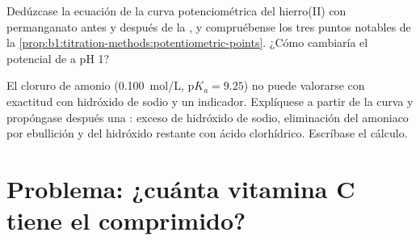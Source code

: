 \begin{exercise}[$\star\star\star$]\label{exo:b1:titration-methods:11}
Dedúzcase la ecuación de la curva potenciométrica del hierro(II) con
permanganato antes y después de la , y compruébense los tres
puntos notables de la
\cref{prop:b1:titration-methods:potentiometric-points}. ¿Cómo cambiaría
el potencial de  a pH 1?
\end{exercise}

\begin{exercise}[$\star\star\star$]\label{exo:b1:titration-methods:12}
El cloruro de amonio (\qty{0.100}{mol/L}, $\mathrm{p}K_a = 9.25$) no
puede valorarse con exactitud con hidróxido de sodio y un indicador.
Explíquese a partir de la curva y propóngase después una : exceso de hidróxido de sodio, eliminación del amoniaco por
ebullición y  del hidróxido restante con ácido clorhídrico.
Escríbase el cálculo.
\end{exercise}

\section{Problema: ¿cuánta vitamina C tiene el comprimido?}

